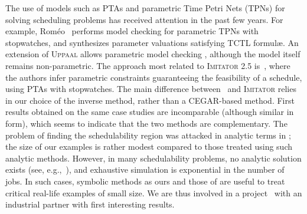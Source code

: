 \documentclass{article}
\newcommand{\IM}{\mathit{IM}}
\newcommand{\imitator}{\textsc{Imitator}}
\newcommand{\romeo}{Rom\'eo}
\newcommand{\uppaal}{\textsc{Uppaal}}
\begin{document}
The use of models such as PTAs and parametric Time Petri Nets (TPNs)
for solving scheduling problems has received attention in the past few years.
For example, \romeo{}~\cite{lrst09} performs 
model checking for parametric TPNs with stopwatches, and synthesizes parameter valuations satisfying TCTL formul\ae{}.
An extension of \uppaal{} allows parametric model checking \cite{BLR05formats}, although the model itself remains non-parametric.
%
%
The approach most related to \imitator{} 2.5 is~\mbox{\cite{cpr08,LPPRC10}}, where the authors infer parametric constraints guaranteeing the feasibility of a schedule, using PTAs with stopwatches.
The main difference between~\cite{cpr08,LPPRC10} and \imitator{} relies in our choice of the inverse method, rather than a CEGAR-based method.
First results obtained on the same case studies
are incomparable (although similar in form), which seems to indicate
that the two methods are complementary.
The problem of finding the schedulability region was attacked in analytic terms
in \cite{bb04};
the size of our examples is rather modest compared to those treated using such analytic methods.
However, in many schedulability problems,
no analytic solution exists (see, e.g.,~\cite{SGL97}), 
and exhaustive simulation is exponential
in the number of jobs. In such cases, symbolic methods as ours and those
of \cite{cpr08,LPPRC10}  are useful to treat
critical real-life examples of small size.
We are thus involved in a project~\cite{fl11} with an industrial partner 
with first interesting results.


\end{document}
